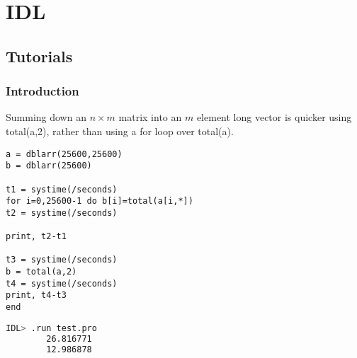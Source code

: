 \documentclass[crop=false,class=book]{standalone}
\begin{document}
\chapter{IDL}
\section{Tutorials}
\subsection{Introduction}
Summing down an $n\times m$ matrix into an $m$ element long vector is quicker
using total(a,2), rather than using a for loop over total(a).\newline
\begin{minipage}[t]{.48\textwidth}
\centering
\begin{lstlisting}[language=idl,basicstyle=\small\ttfamily,frame=single,caption=test.pro]
a = dblarr(25600,25600)
b = dblarr(25600)

t1 = systime(/seconds)
for i=0,25600-1 do b[i]=total(a[i,*])
t2 = systime(/seconds)

print, t2-t1

t3 = systime(/seconds)
b = total(a,2)
t4 = systime(/seconds)
print, t4-t3
end
\end{lstlisting}
\end{minipage}\hfill
\begin{minipage}[t]{.48\textwidth}
\centering
\begin{lstlisting}[language=bash,basicstyle=\small\ttfamily,frame=single,caption=output]
IDL> .run test.pro
        26.816771
        12.986878
\end{lstlisting}
\end{minipage}
\end{document}
